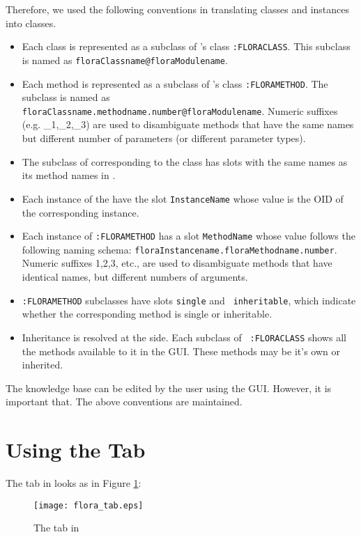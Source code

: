 Therefore, we used the following conventions in translating \fl classes and
instances into \Protege classes.

\begin{itemize}
\item Each \fl class is represented as a subclass of \Protege's
  class {\tt :FLORACLASS}. This
  subclass is named as {\tt floraClassname@floraModulename}.
\item Each \fl method is represented as a subclass of \Protege's class {\tt :FLORAMETHOD}. The
subclass is named as {\tt
floraClassname.methodname.number@floraModulename}. Numeric suffixes (e.g.
\_1,\_2,\_3) are used to disambiguate methods that have the same names but
different number of parameters (or different parameter types).
\item The subclass of  corresponding to the \fl class
has slots with the same names as its \fl method names in \FLORA.
\item Each instance of the 
have the slot {\tt InstanceName} whose value is the OID of the
corresponding \fl instance.
\item Each instance of {\tt :FLORAMETHOD} has a slot
  {\tt MethodName} whose value follows the following naming schema:
{\tt floraInstancename.floraMethodname.number}. Numeric suffixes 1,2,3,
  etc.,  are used to disambiguate methods that have identical names, but
  different numbers of arguments.
\item {\tt :FLORAMETHOD} subclasses have slots {\tt single} and {\tt
inheritable}, which indicate
whether the corresponding \fl method is
single or inheritable.
\item Inheritance is resolved at the \FLORA side. Each subclass of {\tt
    :FLORACLASS} shows all the methods available to it in the \Protege GUI.
  These methods may be it's own  or inherited.
\end{itemize}

The \Protege knowledge base can be edited by the user using the GUI.
However, it is important that. The above conventions are maintained.

\section{Using the \FLORA Tab}
The \FLORA tab in \Protege looks as in Figure
\ref{fig:flora-protege}:
\begin{figure}
\begin{center}
\texttt{[image: flora\_tab.eps]}
\caption{The \FLORA tab in \Protege} \label{fig:flora-protege}
\end{center}
\end{figure}

